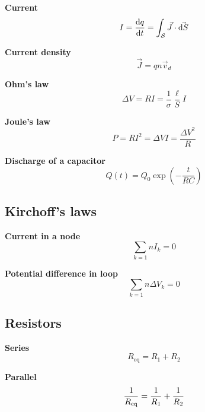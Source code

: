\documentclass[10pt]{extarticle}
\numberwithin{equation}{section}
\begin{document}
\begin{multicols}{2}
	\textbf{Current}
	\begin{equation}
		I = \dv{q}{t} = \int_\mathcal{S} \vec J \cdot \vec{\dd S}
	\end{equation}

	\textbf{Current density}
	\begin{equation}
		\vec J = q n \vec v_d
	\end{equation}

	\textbf{Ohm's law}
	\begin{equation}
		\Delta V = RI = \frac{1}{\sigma} \frac{\ell}{S} I
	\end{equation}

	\textbf{Joule's law}
	\begin{equation}
		P = R I ^2 = \Delta V I = \frac{\Delta V^2}{R}
	\end{equation}

	\textbf{Discharge of a capacitor}
	\begin{equation}
		Q(t) = Q_0 \exp(-\frac{t}{RC})
	\end{equation}

	\subsection{Kirchoff's laws}
	\textbf{Current in a node}
	\begin{equation}
		\sum_{k = 1}{n} I_k = 0
	\end{equation}

	\textbf{Potential difference in loop}
	\begin{equation}
		\sum_{k = 1}{n} \Delta V_k = 0
	\end{equation}

	\subsection{Resistors}

	\textbf{Series}
	\begin{equation}
		R_\text{eq} = R_1 + R_2
	\end{equation}

	\textbf{Parallel}
	\begin{equation}
		\frac{1}{R_\text{eq}} = \frac{1}{R_1} + \frac{1}{R_2}
	\end{equation}
\end{multicols}
\end{document}
